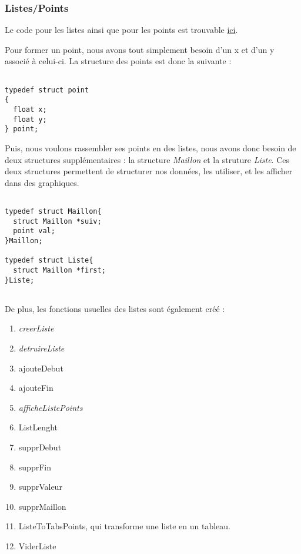 \documentclass[letter]{article}
\begin{document}
\subsubsection{Listes/Points}
\label{sec:orgba548d2}

Le code pour les listes ainsi que pour les points est trouvable \href{listePoint.c}{ici}.

Pour former un point, nous avons tout simplement besoin d'un x et d'un y associé à celui-ci.
La structure des points est donc la suivante :

\begin{verbatim}

typedef struct point
{
  float x;
  float y;
} point;

\end{verbatim}

Puis, nous voulons rassembler ses points en des listes, nous avons donc besoin de deux structures supplémentaires : la structure \emph{Maillon} et la struture \emph{Liste}. Ces deux structures permettent de structurer nos données, les utiliser, et les afficher dans des graphiques.

\begin{verbatim}

typedef struct Maillon{
  struct Maillon *suiv;
  point val;
}Maillon;

typedef struct Liste{
  struct Maillon *first;
}Liste;


\end{verbatim}

De plus, les fonctions usuelles des listes sont également créé :
\begin{enumerate}
\item \emph{creerListe}
\item \emph{detruireListe}
\item ajouteDebut
\item ajouteFin
\item \emph{afficheListePoints}
\item ListLenght
\item supprDebut
\item supprFin
\item supprValeur
\item supprMaillon
\item ListeToTabsPoints, qui transforme une liste en un tableau.
\item ViderListe
\end{enumerate}
\end{document}
